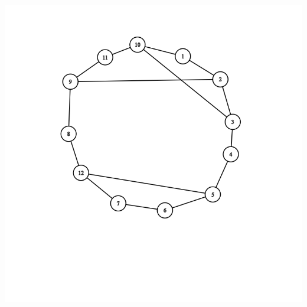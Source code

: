 \documentclass{article}
\begin{document}
\begin{center}
  \includegraphics[scale=0.5]{graph2.png}
\end{center}
\end{document}
